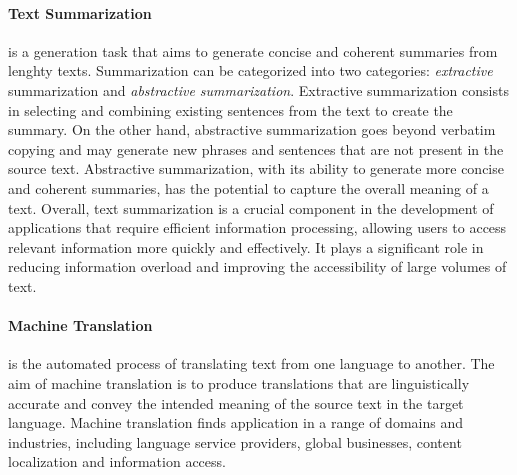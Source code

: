 \paragraph{Text Summarization} is a generation task that aims to generate concise and coherent summaries from lenghty texts. Summarization can be categorized into two categories: \textit{extractive} summarization and \textit{abstractive summarization}. Extractive summarization consists in selecting and combining existing sentences from the text to create the summary. On the other hand, abstractive summarization goes beyond verbatim copying and may generate new phrases and sentences that are not present in the source text. Abstractive summarization, with its ability to generate more concise and coherent summaries, has the potential to capture the overall meaning of a text. Overall, text summarization is a crucial component in the development of applications that require efficient information processing, allowing users to access relevant information more quickly and effectively. It plays a significant role in reducing information overload and improving the accessibility of large volumes of text.

\paragraph{Machine Translation} is the automated process of translating text from one language to another. The aim of machine translation is to produce translations that are linguistically accurate and convey the intended meaning of the source text in the target language. Machine translation finds application in a range of domains and industries, including language service providers, global businesses, content localization and information access. 

